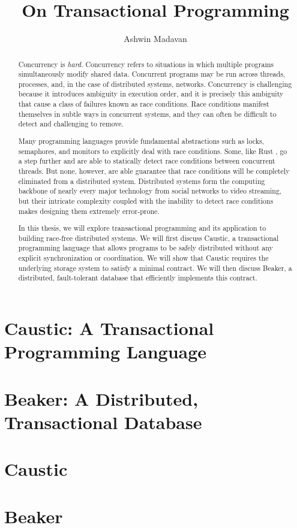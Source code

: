 \documentclass[12pt]{report}
\begin{document}
\title{On Transactional Programming}
\author{Ashwin Madavan}
\maketitle

\begin{abstract}
  Concurrency is \emph{hard}. Concurrency refers to situations in which multiple programs
  simultaneously modify shared data. Concurrent programs may be run across threads, processes,
  and, in the case of distributed systems, networks. Concurrency is challenging because it
  introduces ambiguity in execution order, and it is precisely this ambiguity that cause a class of
  failures known as race conditions. Race conditions manifest themselves in subtle ways in
  concurrent systems, and they can often be difficult to detect and challenging to remove.

  Many programming languages provide fundamental abstractions such as locks, semaphores, and
  monitors to explicitly deal with race conditions. Some, like Rust \cite{rust}, go a step further
  and are able to statically detect race conditions between concurrent threads. But none, however,
  are able guarantee that race conditions will be completely eliminated from a distributed system.
  Distributed systems form the computing backbone of nearly every major technology from social
  networks to video streaming, but their intricate complexity coupled with the inability to detect
  race conditions makes designing them extremely error-prone.

  In this thesis, we will explore transactional programming and its application to building
  race-free distributed systems. We will first discuss Caustic, a transactional programming language
  that allows programs to be safely distributed without any explicit synchronization or
  coordination. We will show that Caustic requires the underlying storage system to satisfy a
  minimal contract. We will then discuss Beaker, a distributed, fault-tolerant database that
  efficiently implements this contract.
\end{abstract}

\tableofcontents

\chapter{Caustic: A Transactional Programming Language}


\chapter{Beaker: A Distributed, Transactional Database}


\appendix
\chapter{Caustic}


\chapter{Beaker}


\printbibliography
\end{document}
